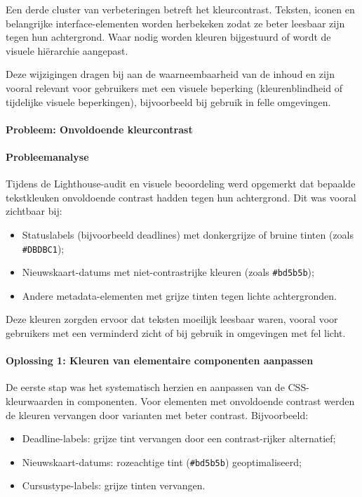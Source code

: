Een derde cluster van verbeteringen betreft het kleurcontrast. Teksten, iconen en belangrijke interface-elementen worden herbekeken zodat ze beter leesbaar zijn tegen hun achtergrond. Waar nodig worden kleuren bijgestuurd of wordt de visuele hiërarchie aangepast.

Deze wijzigingen dragen bij aan de waarneembaarheid van de inhoud en zijn vooral relevant voor gebruikers met een visuele beperking (kleurenblindheid of tijdelijke visuele beperkingen), bijvoorbeeld bij gebruik in felle omgevingen.

\paragraph{Probleem: Onvoldoende kleurcontrast}

\paragraph{Probleemanalyse}

Tijdens de Lighthouse-audit en visuele beoordeling werd opgemerkt dat bepaalde tekstkleuken onvoldoende contrast hadden tegen hun achtergrond. Dit was vooral zichtbaar bij:

\begin{itemize}
	\item Statuslabels (bijvoorbeeld deadlines) met donkergrijze of bruine tinten (zoals \texttt{\#DBDBC1});
	\item Nieuwskaart-datums met niet-contrastrijke kleuren (zoals \texttt{\#bd5b5b});
	\item Andere metadata-elementen met grijze tinten tegen lichte achtergronden.
\end{itemize}

Deze kleuren zorgden ervoor dat teksten moeilijk leesbaar waren, vooral voor gebruikers met een verminderd zicht of bij gebruik in omgevingen met fel licht.

\paragraph{Oplossing 1: Kleuren van elementaire componenten aanpassen}

De eerste stap was het systematisch herzien en aanpassen van de CSS-kleurwaarden in componenten. Voor elementen met onvoldoende contrast werden de kleuren vervangen door varianten met beter contrast. Bijvoorbeeld:

\begin{itemize}
	\item Deadline-labels: grijze tint vervangen door een contrast-rijker alternatief;
	\item Nieuwskaart-datums: rozeachtige tint (\texttt{\#bd5b5b}) geoptimaliseerd;
	\item Cursustype-labels: grijze tinten vervangen.
\end{itemize}

